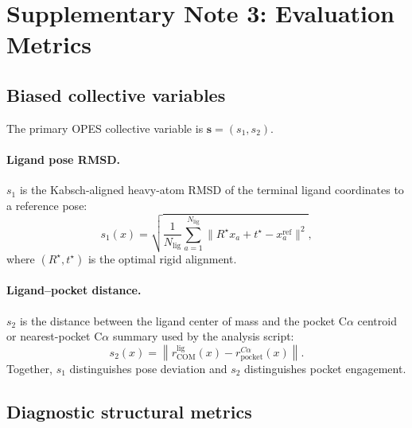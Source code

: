 \documentclass[11pt,a4paper]{article}
\begin{document}
\section{Supplementary Note 3: Evaluation Metrics}
\label{sec:metrics}

\subsection{Biased collective variables}

The primary OPES collective variable is
$\mathbf{s}=(s_1,s_2)$.

\paragraph{Ligand pose RMSD.}
$s_1$ is the Kabsch-aligned heavy-atom RMSD of the terminal ligand coordinates
to a reference pose:
\begin{equation}
  s_1(x)=
  \sqrt{\frac{1}{N_{\mathrm{lig}}}
  \sum_{a=1}^{N_{\mathrm{lig}}}
  \|R^\star x_a+t^\star-x^{\mathrm{ref}}_a\|^2},
\end{equation}
where $(R^\star,t^\star)$ is the optimal rigid alignment.

\paragraph{Ligand--pocket distance.}
$s_2$ is the distance between the ligand center of mass and the pocket
C$\alpha$ centroid or nearest-pocket C$\alpha$ summary used by the analysis
script:
\begin{equation}
  s_2(x)=\left\|r_{\mathrm{COM}}^{\mathrm{lig}}(x)-
  r_{\mathrm{pocket}}^{C\alpha}(x)\right\|.
\end{equation}
Together, $s_1$ distinguishes pose deviation and $s_2$ distinguishes pocket
engagement.

\subsection{Diagnostic structural metrics}
\end{document}
